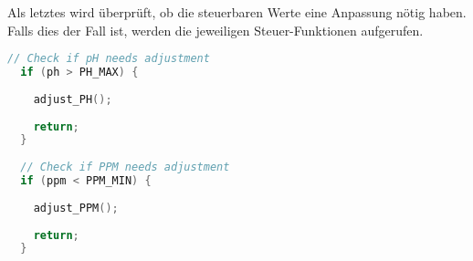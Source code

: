 \documentclass{report}
\begin{document}
\vspace{20pt}
Als letztes wird überprüft, ob die steuerbaren Werte eine Anpassung nötig haben. Falls dies der Fall ist, werden die jeweiligen Steuer-Funktionen aufgerufen.
\vspace{20pt}
\begin{lstlisting}[language = C,caption = Aufruf Steuer-Funktionen]
      // Check if pH needs adjustment
  if (ph > PH_MAX) {
    
    adjust_PH();
    
    return;
  }
  
  // Check if PPM needs adjustment
  if (ppm < PPM_MIN) {
    
    adjust_PPM();
    
    return;
  }
\end{lstlisting}
\vspace{20pt}
\end{document}
